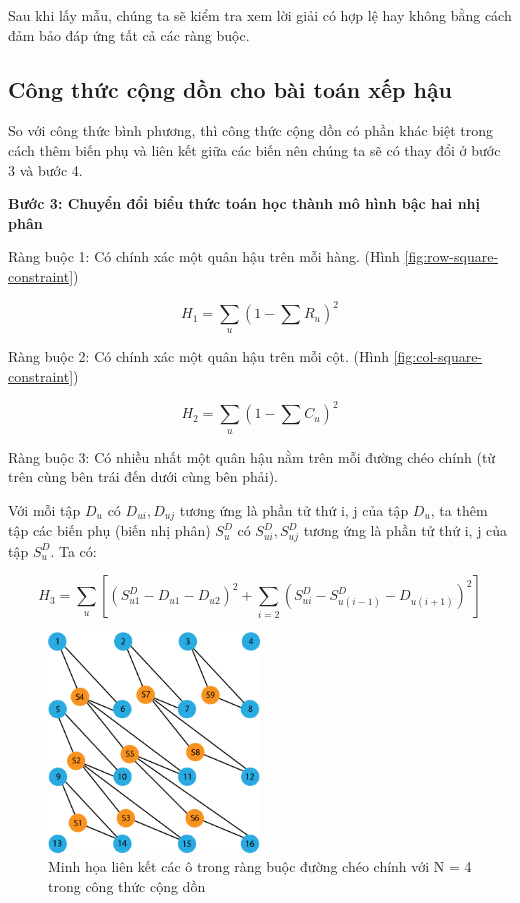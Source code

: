     Sau khi lấy mẫu, chúng ta sẽ kiểm tra xem lời giải có hợp lệ hay không bằng cách đảm bảo đáp ứng tất cả các ràng buộc.

\subsection{Công thức cộng dồn cho bài toán xếp hậu}

So với công thức bình phương, thì công thức cộng dồn có phần khác biệt trong cách thêm biến phụ và liên kết giữa các biến 
nên chúng ta sẽ có thay đổi ở bước 3 và bước 4.

\textbf{Bước 3: Chuyển đổi biểu thức toán học thành mô hình bậc hai nhị phân}

Ràng buộc 1: Có chính xác một quân hậu trên mỗi hàng. (Hình \ref{fig:row-square-constraint})

\[
H_1 = \sum_{u}^{}{(1-\sum{}^{}{R_u})^2}
\]


Ràng buộc 2: Có chính xác một quân hậu trên mỗi cột. (Hình \ref{fig:col-square-constraint})

\[
H_2 = \sum_{u}^{}{(1-\sum{}^{}{C_u})^2}
\]

Ràng buộc 3: Có nhiều nhất một quân hậu nằm trên mỗi đường chéo chính (từ trên cùng bên trái đến dưới cùng bên phải).


Với mỗi tập $D_u$ có $D_{ui}, D_{uj}$ tương ứng là phần tử thứ i, j của tập $D_u$, ta thêm tập các biến phụ (biến nhị phân) $S_{u}^{D} $ có $S_{ui}^{D}, S_{uj}^{D}$ tương ứng là phần tử thứ i, j của tập $S_{u}^{D}$. Ta có:

\[
H_3 = \sum_{u}^{}{\left[ (S_{u1}^{D} - D_{u1} - D_{u2})^2 + \sum_{i=2}^{}{(S_{ui}^{D} - S_{u(i-1)}^{D} - D_{u(i+1)})^2}  \right]}
\]

\begin{figure}[H]
	\centering
	\includegraphics[width=0.5\textwidth]{images/main_diag_add_constraint.png}
	\caption{Minh họa liên kết các ô trong ràng buộc đường chéo chính với N = 4 trong công thức cộng dồn}
\end{figure}

